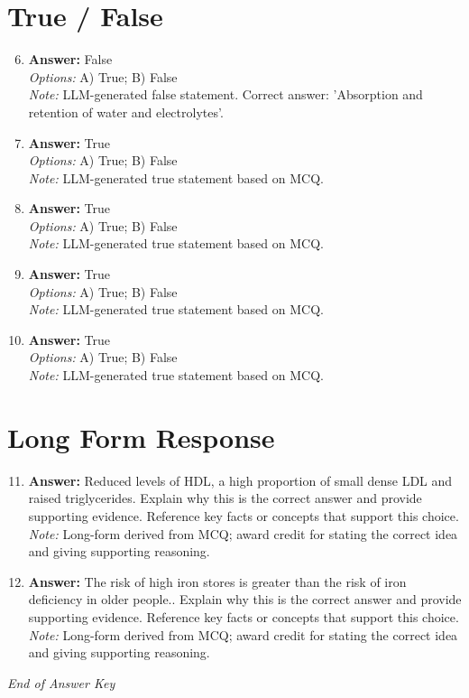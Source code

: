 \documentclass[12pt]{article}
\begin{document}
\section*{True / False}
\begin{enumerate}[label=\arabic*.]
\setcounter{enumi}{5}
\item \textbf{Answer:} False
\\ \textit{Options:} A) True; B) False
\\ \textit{Note:} LLM-generated false statement. Correct answer: 'Absorption and retention of water and electrolytes'.
\item \textbf{Answer:} True
\\ \textit{Options:} A) True; B) False
\\ \textit{Note:} LLM-generated true statement based on MCQ.
\item \textbf{Answer:} True
\\ \textit{Options:} A) True; B) False
\\ \textit{Note:} LLM-generated true statement based on MCQ.
\item \textbf{Answer:} True
\\ \textit{Options:} A) True; B) False
\\ \textit{Note:} LLM-generated true statement based on MCQ.
\item \textbf{Answer:} True
\\ \textit{Options:} A) True; B) False
\\ \textit{Note:} LLM-generated true statement based on MCQ.
\end{enumerate}

\section*{Long Form Response}
\begin{enumerate}[label=\arabic*.]
\setcounter{enumi}{10}
\item \textbf{Answer:} Reduced levels of HDL, a high proportion of small dense LDL and raised triglycerides. Explain why this is the correct answer and provide supporting evidence. Reference key facts or concepts that support this choice.
\\ \textit{Note:} Long-form derived from MCQ; award credit for stating the correct idea and giving supporting reasoning.
\item \textbf{Answer:} The risk of high iron stores is greater than the risk of iron deficiency in older people.. Explain why this is the correct answer and provide supporting evidence. Reference key facts or concepts that support this choice.
\\ \textit{Note:} Long-form derived from MCQ; award credit for stating the correct idea and giving supporting reasoning.
\end{enumerate}

\vfill
\noindent\textit{End of Answer Key}
\end{document}
